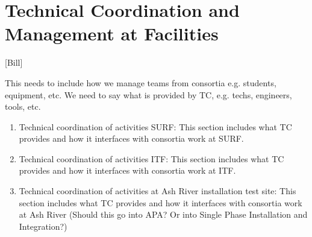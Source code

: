 \chapter{Technical Coordination and Management at Facilities}
\label{vl:tc-facility_mgmt}

[Bill]

This needs to include how we manage teams from consortia
e.g. students, equipment, etc. We need to say what is provided by TC,
e.g. techs, engineers, tools, etc.
\begin{enumerate}
 \item Technical coordination of activities SURF: This section includes what TC provides and how it interfaces with consortia work at SURF.
 \item Technical coordination of activities ITF: This section includes what TC provides and how it interfaces with consortia work at ITF.
 \item Technical coordination of activities at Ash River installation
   test site: This section includes what TC provides and how it
   interfaces with consortia work at Ash River (Should this go into
   APA? Or into Single Phase Installation and Integration?)
\end{enumerate}

